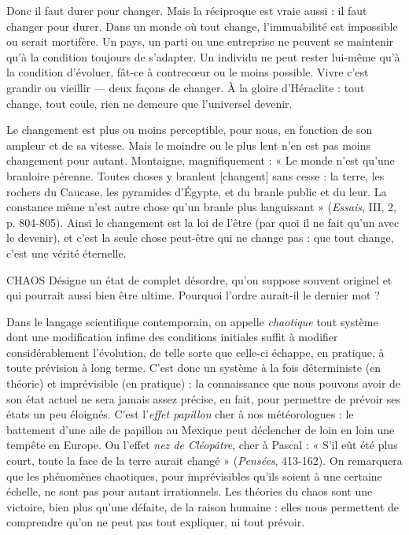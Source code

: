 Donc il faut durer pour changer. Mais la réciproque est vraie aussi : il faut
changer pour durer. Dans un monde où tout change, l’immuabilité est impossible
ou serait mortifère. Un pays, un parti ou une entreprise ne peuvent se
maintenir qu’à la condition toujours de s’adapter. Un individu ne peut rester
lui-même qu’à la condition d’évoluer, fât-ce à contrecœur ou le moins possible.
Vivre c’est grandir ou vieillir — deux façons de changer. À la gloire
d’Héraclite : tout change, tout coule, rien ne demeure que l’universel devenir.

Le changement est plus ou moins perceptible, pour nous, en fonction de
son ampleur et de sa vitesse. Mais le moindre ou le plus lent n’en est pas moins
changement pour autant. Montaigne, magnifiquement : « Le monde n’est
qu’une branloire pérenne. Toutes choses y branlent [changent] sans cesse : la
terre, les rochers du Caucase, les pyramides d'Égypte, et du branle public et du
leur. La constance même n’est autre chose qu’un branle plus languissant »
({\it Essais}, III, 2, p. 804-805). Ainsi le changement est la loi de l’être (par quoi il
ne fait qu’un avec le devenir), et c’est la seule chose peut-être qui ne change
pas : que tout change, c’est une vérité éternelle.

CHAOS Désigne un état de complet désordre, qu’on suppose souvent originel
et qui pourrait aussi bien être ultime. Pourquoi l’ordre aurait-il le dernier mot ?

Dans le langage scientifique contemporain, on appelle {\it chaotique} tout système
dont une modification infime des conditions initiales suffit à modifier
considérablement l’évolution, de telle sorte que celle-ci échappe, en pratique, à
toute prévision à long terme. C’est donc un système à la fois déterministe (en
théorie) et imprévisible (en pratique) : la connaissance que nous pouvons avoir
de son état actuel ne sera jamais assez précise, en fait, pour permettre de prévoir
ses états un peu éloignés. C’est l'{\it effet papillon} cher à nos météorologues : le battement
d’une aile de papillon au Mexique peut déclencher de loin en loin une
tempête en Europe. Ou l'effet {\it nez de Cléopâtre}, cher à Pascal : « S’il eût été plus
court, toute la face de la terre aurait changé » ({\it Pensées}, 413-162). On remarquera
que les phénomènes chaotiques, pour imprévisibles qu’ils soient à une
certaine échelle, ne sont pas pour autant irrationnels. Les théories du chaos sont
une victoire, bien plus qu’une défaite, de la raison humaine : elles nous permettent
de comprendre qu’on ne peut pas tout expliquer, ni tout prévoir.

